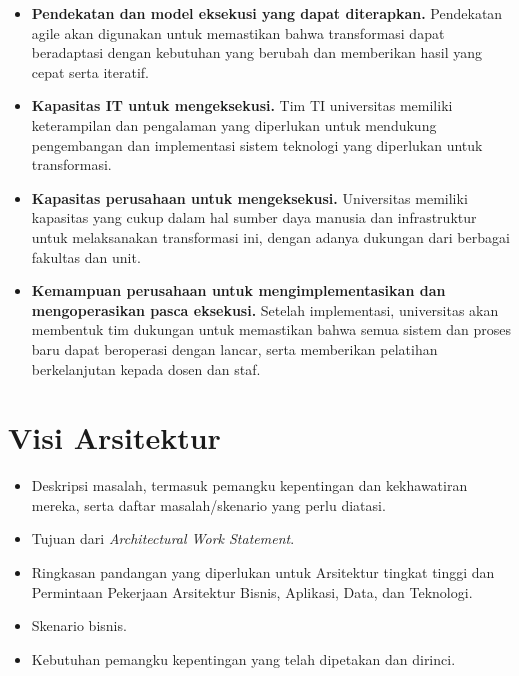 \begin{itemize}
	\item \textbf{Pendekatan dan model eksekusi yang dapat diterapkan.} Pendekatan agile akan digunakan untuk memastikan bahwa transformasi dapat beradaptasi dengan kebutuhan yang berubah dan memberikan hasil yang cepat serta iteratif.
	
	\item \textbf{Kapasitas IT untuk mengeksekusi.} Tim TI universitas memiliki keterampilan dan pengalaman yang diperlukan untuk mendukung pengembangan dan implementasi sistem teknologi yang diperlukan untuk transformasi.
	
	\item \textbf{Kapasitas perusahaan untuk mengeksekusi.} Universitas memiliki kapasitas yang cukup dalam hal sumber daya manusia dan infrastruktur untuk melaksanakan transformasi ini, dengan adanya dukungan dari berbagai fakultas dan unit.
	
	\item \textbf{Kemampuan perusahaan untuk mengimplementasikan dan mengoperasikan pasca eksekusi.} Setelah implementasi, universitas akan membentuk tim dukungan untuk memastikan bahwa semua sistem dan proses baru dapat beroperasi dengan lancar, serta memberikan pelatihan berkelanjutan kepada dosen dan staf.
\end{itemize}


\section{Visi Arsitektur}
\label{sec:visi_arsitektur}
\begin{itemize}
	\item Deskripsi masalah, termasuk pemangku kepentingan dan kekhawatiran mereka, serta daftar masalah/skenario yang perlu diatasi.
	\item Tujuan dari \textit{Architectural Work Statement}.
	\item Ringkasan pandangan yang diperlukan untuk Arsitektur tingkat tinggi dan Permintaan Pekerjaan Arsitektur Bisnis, Aplikasi, Data, dan Teknologi.
	\item Skenario bisnis.
	\item Kebutuhan pemangku kepentingan yang telah dipetakan dan dirinci.
\end{itemize}


